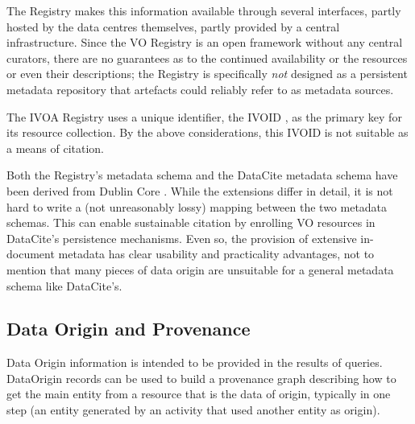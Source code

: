 \documentclass[11pt,a4paper]{ivoa}
\begin{document}
The Registry makes this information available through several interfaces, partly
hosted by the data centres themselves, partly provided by a central
infrastructure.
Since the VO Registry is an open framework without any central curators,
there are no guarantees as to the continued availability or the resources or even their descriptions; the Registry is
specifically \emph{not} designed as a persistent metadata repository
that artefacts could reliably refer to as metadata sources.

The IVOA Registry uses a unique identifier, the IVOID
\citep{2016ivoa.spec.0523D}, as the primary key for its resource
collection.  By the above considerations, this IVOID is not suitable as a means of citation.

Both the Registry's metadata schema and the DataCite
\citep{std:DataCite40} metadata schema have been
derived from Dublin Core \citep{std:DUBLINCORE}.  While the extensions differ in detail, it is not
hard to write a (not unreasonably lossy) mapping between the two metadata schemas.  This can enable
sustainable citation by enrolling VO resources in DataCite's persistence
mechanisms.  Even so, the provision of extensive in-document metadata
has clear usability and practicality advantages, not to mention that many
pieces of data origin are unsuitable for a general metadata schema like
DataCite's.

\subsection{Data Origin and Provenance}


Data Origin information is intended to be provided in the results of queries.
DataOrigin records can be used to build a provenance graph describing how to
get the main entity from a resource that is the data of origin, typically in one step
(an entity generated by an activity that used another entity as origin).
\end{document}
